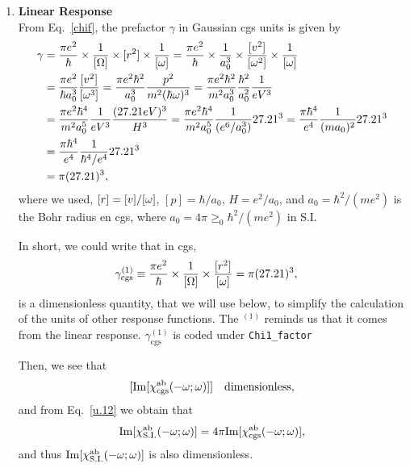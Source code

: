 \documentclass[12pt]{article}
\numberwithin{equation}{section}
\begin{document}
\begin{enumerate}
\item {\bf Linear Response}\\ 
From Eq.~\eqref{chif}, the prefactor $\gamma$ in Gaussian cgs units is given by  
\begin{align}\label{e.4}
\gamma 
&=
\frac{\pi e^2}{\hbar}\times\frac{1}{[\Omega]}
\times [r^2] \times \frac{1}{[\omega]}
=
\frac{\pi e^2}{\hbar}\times\frac{1}{a^3_0}
\times \frac{[v^2]}{[\omega^2]} 
\times \frac{1}{[\omega]}
\nonumber\\
&
=
\frac{\pi e^2}{\hbar a^3_0}\frac{[v^2]}{[\omega^3]} 
=
\frac{\pi e^2\hbar^2}{a^3_0}\frac{p^2}{m^2(\hbar\omega)^3} 
=
\frac{\pi e^2\hbar^2}{m^2a^3_0}\frac{\hbar^2}{a^2_0}\frac{1}{eV^3} 
\nonumber\\
&
=
\frac{\pi e^2\hbar^4}{m^2a^5_0}\frac{1}{eV^3} 
\frac{(27.21eV)^3}{H^3}
=
\frac{\pi e^2\hbar^4}{m^2a^5_0}
\frac{1}{(e^6/a^3_0)}27.21^3 
=
\frac{\pi \hbar^4}{e^4}
\frac{1}{(ma_0)^2}27.21^3 
\nonumber\\
&=
\frac{\pi \hbar^4}{e^4}
\frac{1}{\hbar^4/e^4}27.21^3 
\nonumber\\
&=\pi (27.21)^3 
, 
\end{align} 
where we used, 
$[r]=[v]/[\omega]$, $[p]=\hbar/a_0$, $H=e^2/a_0$, and  
$a_0=\hbar^2/(me^2)$  
is the Bohr radius en cgs, where
$a_0=4\pi\ge_0\hbar^2/(me^2)$ in S.I. 

In short, we could write that in cgs,  
\begin{align}\label{e.69}
\gamma^{(1)}_{\mathrm{cgs}} 
&\equiv
\frac{\pi e^2}{\hbar}\times\frac{1}{[\Omega]}
\times \frac{[r^2]}{[\omega]}
=\pi (27.21)^3, 
\end{align}
is a dimensionless quantity, that we will use below, to simplify the
calculation of the units of other response functions. The $^{(1)}$
reminds us that it comes from the linear response.
$\gamma^{(1)}_{\mathrm{cgs}}$ is coded under \verb=Chi1_factor=

Then, we see that 
\begin{align}\label{dim1o}
[\mathrm{Im}[\chi^{\mathrm{a}\mathrm{b}}_{\mathrm{cgs}}(-\omega;\omega)]] \quad\mathrm{dimensionless} 
, 
\end{align} 
and from Eq.~\eqref{u.12} we obtain that
\begin{align}\label{dim1}
\mathrm{Im}[\chi^{\mathrm{a}\mathrm{b}}_{\mathrm{S.I.}}(-\omega;\omega)] 
=4\pi
\mathrm{Im}[\chi^{\mathrm{a}\mathrm{b}}_{\mathrm{cgs}}(-\omega;\omega)] 
, 
\end{align}
and thus
$\mathrm{Im}[\chi^{\mathrm{a}\mathrm{b}}_{\mathrm{S.I.}}(-\omega;\omega)]$
is also dimensionless. 
  

\end{enumerate}
\end{document}
